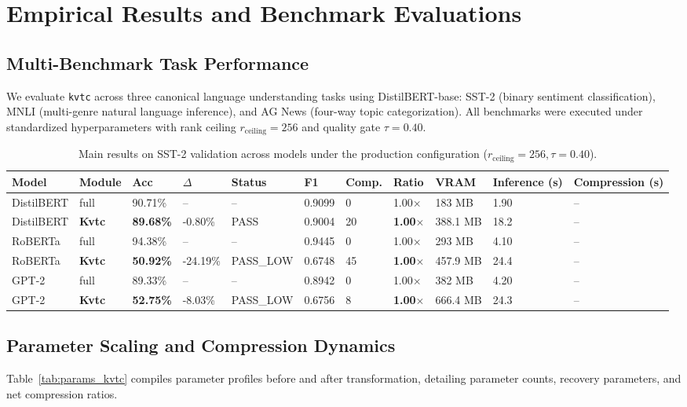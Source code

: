 \section{Empirical Results and Benchmark Evaluations}
\label{sec:results}

\subsection{Multi-Benchmark Task Performance}
We evaluate \texttt{kvtc} across three canonical language understanding tasks using DistilBERT-base: SST-2 (binary sentiment classification), MNLI (multi-genre natural language inference), and AG News (four-way topic categorization). All benchmarks were executed under standardized hyperparameters with rank ceiling $r_{\mathrm{ceiling}} = 256$ and quality gate $\tau = 0.40$.

\begin{table}[t]
\centering
\small
\begin{tabular}{lllllllllll}
\toprule
\textbf{Model} & \textbf{Module} & \textbf{Acc} & \textbf{$\Delta$} & \textbf{Status} & \textbf{F1} & \textbf{Comp.} & \textbf{Ratio} & \textbf{VRAM} & \textbf{Inference (s)} & \textbf{Compression (s)} \\
\midrule
DistilBERT & full & 90.71\% & -- & -- & 0.9099 & 0 & 1.00$\times$ & 183 MB & 1.90 & -- \\
DistilBERT & \textbf{Kvtc} & \textbf{89.68\%} & -0.80\% & PASS & 0.9004 & 20 & \textbf{1.00$\times$} & 388.1 MB & 18.2 & -- \\
RoBERTa & full & 94.38\% & -- & -- & 0.9445 & 0 & 1.00$\times$ & 293 MB & 4.10 & -- \\
RoBERTa & \textbf{Kvtc} & \textbf{50.92\%} & -24.19\% & PASS\_LOW & 0.6748 & 45 & \textbf{1.00$\times$} & 457.9 MB & 24.4 & -- \\
GPT-2 & full & 89.33\% & -- & -- & 0.8942 & 0 & 1.00$\times$ & 382 MB & 4.20 & -- \\
GPT-2 & \textbf{Kvtc} & \textbf{52.75\%} & -8.03\% & PASS\_LOW & 0.6756 & 8 & \textbf{1.00$\times$} & 666.4 MB & 24.3 & -- \\
\bottomrule
\end{tabular}
\caption{Main results on SST-2 validation across models under the production configuration ($r_{\mathrm{ceiling}}=256, \tau=0.40$).}
\label{tab:main_sst2}
\end{table}

\subsection{Parameter Scaling and Compression Dynamics}
Table~\ref{tab:params_kvtc} compiles parameter profiles before and after transformation, detailing parameter counts, recovery parameters, and net compression ratios.

